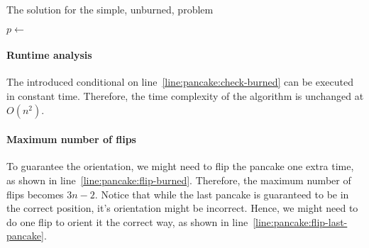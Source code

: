 \begin{algorithm}
	\caption{The solution for the simple, unburned, problem}
	\begin{algorithmic}[1]
			  \label{}
				\State {} \label{line:pancake:flip-last-pancake}
			\EndIf
			\State \Return
		\EndIf
	  	\State $p \gets$   \label{line:pancake:find}
		\State {}  \label{line:pancake:flip-large}
		 \label{line:pancake:check-burned}  \label{}
			\State {}  \label{line:pancake:flip-burned}
		\EndIf
		\State {}  \label{line:pancake:flip-all}
		\State {}
	  \EndFunction
	\end{algorithmic}
	\label{algo:pancakes-burned}
\end{algorithm}

\paragraph{Runtime analysis}
The introduced conditional on line~\ref{line:pancake:check-burned} can be executed in constant time.
Therefore, the time complexity of the algorithm is unchanged at $O(n^2)$.

\paragraph{Maximum number of flips}
To guarantee the orientation, we might need to flip the pancake one extra time, as shown in line~\ref{line:pancake:flip-burned}.
Therefore, the maximum number of flips becomes $3n-2$.
Notice that while the last pancake is guaranteed to be in the correct position, it's orientation might be incorrect.
Hence, we might need to do one flip to orient it the correct way, as shown in line~\ref{line:pancake:flip-last-pancake}.